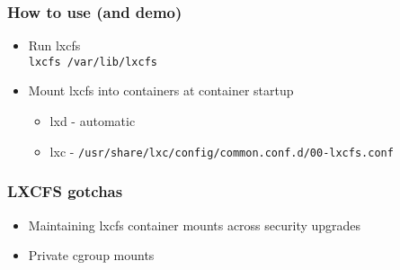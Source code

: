 \documentclass{beamer}
\begin{document}
\begin{frame}
\frametitle{How to use (and demo)}
\begin{itemize}
\item Run lxcfs \\
{\tt lxcfs /var/lib/lxcfs}
\item Mount lxcfs into containers at container startup
	\begin{itemize}
	\item lxd - automatic
	\item lxc - {\tt /usr/share/lxc/config/common.conf.d/00-lxcfs.conf}
	\end{itemize}
\end{itemize}
\end{frame}

\begin{frame}
\frametitle{LXCFS gotchas}
	\begin{itemize}
	\item Maintaining lxcfs container mounts across security upgrades
	\item Private cgroup mounts
	\end{itemize}
\end{frame}

\end{document}
